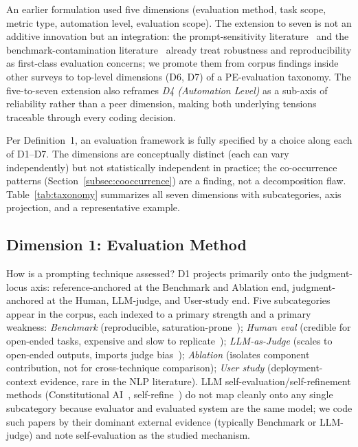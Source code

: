 \documentclass[acmsmall, nonacm, screen]{acmart}
\begin{document}
An earlier formulation used five dimensions (evaluation method, task
scope, metric type, automation level, evaluation scope). The
extension to seven is not an additive innovation but an integration:
the prompt-sensitivity literature~\cite{sclar2023formatting,
promptsensitivity2025, butterfly2024, mizrahi2024state,
zhuo2024prosa, errica2024sensitivity, vaugrante2024replication} and
the benchmark-contamination literature~\cite{ni2025benchmarks,
feng2025sage, mcintosh2024inadequacies, balloccu2024leakcheat}
already treat robustness and reproducibility as first-class
evaluation concerns; we promote them from corpus findings inside
other surveys to top-level dimensions (D6, D7) of a PE-evaluation
taxonomy. The five-to-seven extension also reframes
\textit{D4 (Automation Level)} as a sub-axis of reliability rather
than a peer dimension, making both underlying tensions traceable
through every coding decision.

Per Definition~1, an evaluation framework is fully specified by a
choice along each of D1--D7. The dimensions are conceptually distinct
(each can vary independently) but not statistically independent in
practice; the co-occurrence patterns
(Section~\ref{subsec:cooccurrence}) are a finding, not a decomposition
flaw. Table~\ref{tab:taxonomy} summarizes all seven dimensions with
subcategories, axis projection, and a representative example.

\subsection{Dimension 1: Evaluation Method}
\label{subsec:d1}

How is a prompting technique assessed? D1 projects primarily onto the
judgment-locus axis: reference-anchored at the Benchmark and Ablation
end, judgment-anchored at the Human, LLM-judge, and User-study end.
Five subcategories appear in the corpus, each indexed to a primary
strength and a primary weakness: \emph{Benchmark} (reproducible,
saturation-prone~\cite{hendrycks2021measuring, ni2025benchmarks});
\emph{Human eval} (credible for open-ended tasks, expensive and slow
to replicate~\cite{chang2023survey}); \emph{LLM-as-Judge} (scales to
open-ended outputs, imports judge bias~\cite{zheng2023judging,
dubois2024alpacaeval, gu2025llmjudge}); \emph{Ablation} (isolates
component contribution, not for cross-technique comparison);
\emph{User study} (deployment-context evidence, rare in the NLP
literature). LLM self-evaluation/self-refinement methods
(Constitutional AI~\cite{bai2022constitutional}, self-refine~\cite{madaan2023selfrefine})
do not map cleanly onto any single subcategory because evaluator and
evaluated system are the same model; we code such papers by their
dominant external evidence (typically Benchmark or LLM-judge) and
note self-evaluation as the studied mechanism.
\end{document}
